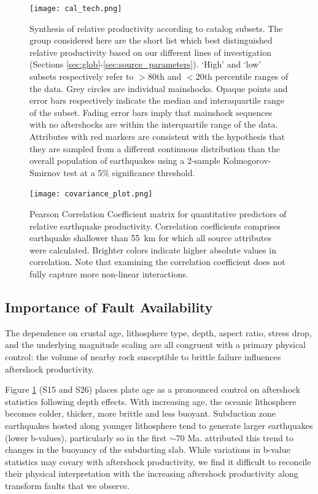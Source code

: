 \documentclass[draft, jgrga]{agujournal2018}
\begin{document}
 \begin{figure}
        \centering
        \texttt{[image: cal\_tech.png]}
        \caption{Synthesis of relative productivity according to catalog subsets. The group considered here are the short list which best distinguished relative productivity based on our different lines of investigation (Sections \ref{sec:glob}-\ref{sec:source_parameters}). `High' and `low' subsets respectively refer to $>80$th and $<20$th percentile ranges of the data. Grey circles are individual mainshocks. Opaque points and error bars respectively indicate the median and interaquartile range of the subset. Fading error bars imply that mainshock sequences with no aftershocks are within the interquartile range of the data. Attributes with red markers are consistent with the hypothesis that they are sampled from a different continuous distribution than the overall population of earthquakes using a 2-sample Kolmogorov-Smirnov test at a 5\% significance threshold.}
        \label{fig:caltech}
    \end{figure}

 \begin{figure}
    \centering
    \texttt{[image: covariance\_plot.png]}
    \caption{Pearson Correlation Coefficient matrix for quantitative predictors of relative earthquake productivity. Correlation coefficients comprises earthquake shallower than 55~km for which all source attributes were calculated. Brighter colors indicate higher absolute values in correlation. Note that examining the correlation coefficient does not fully capture more non-linear interactions.}
    \label{fig:covariance}
\end{figure}

\subsection{Importance of Fault Availability}

The dependence on crustal age, lithosphere type, depth, aspect ratio, stress drop, and the underlying magnitude scaling are all congruent with a primary physical control: the volume of nearby rock susceptible to brittle failure influences aftershock productivity.

Figure \ref{fig:caltech} (S15 and S26) places plate age as a pronounced control on aftershock statistics following depth effects. With increasing age, the oceanic lithosphere becomes colder, thicker, more brittle and less buoyant. Subduction zone earthquakes hosted along younger lithosphere tend to generate larger earthquakes (lower b-values), particularly so in the first $\sim70$ Ma. \citet{Nishikawa2014EarthquakeBuoyancy} attributed this trend to changes in the buoyancy of the subducting slab. While variations in b-value statistics may covary with aftershock productivity, we find it difficult to reconcile their physical interpretation with the increasing aftershock productivity along transform faults that we observe.
\end{document}
